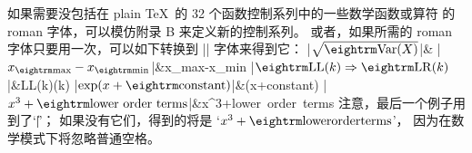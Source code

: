 \danger 如果需要没包括在 plain \TeX\ 的 32 个函数控制系列中的一些数学函数或算符%
的 roman 字体，可以模仿附录 B 来定义新的控制系列。%
或者，如果所需的 roman 字体只要用一次，可以如下转换到 |\rm| 字体来得到它：
\beginlongmathdemo
|$\sqrt{{\rm Var}(X)}$|&\cr
|$x_{\rm max}-x_{\rm min}$|&x_{\rm max}-x_{\rm min}\cr
|${\rm LL}(k)\Rightarrow{\rm LR}(k)$|&{\rm LL}(k)(k)\cr
|$\exp(x+{\rm constant})$|&\exp(x+{\rm constant})\cr
|$x^3+{\rm lower\ order\ terms}$|&x^3+{\rm lower\ order\ terms}\cr
\endmathdemo
注意，最后一个例子用到了`|\|\]'；
如果没有它们，得到的将是 `$x^3+{\rm lower order terms}$'，
因为在数学模式下将忽略普通空格。

